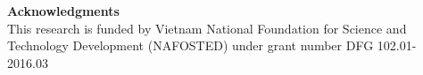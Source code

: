 \documentclass[final]{elsarticle}
\begin{document}
\textbf{Acknowledgments}\\
This research is funded by Vietnam National Foundation for Science and Technology Development (NAFOSTED) under grant number DFG 102.01-2016.03
\end{document}
